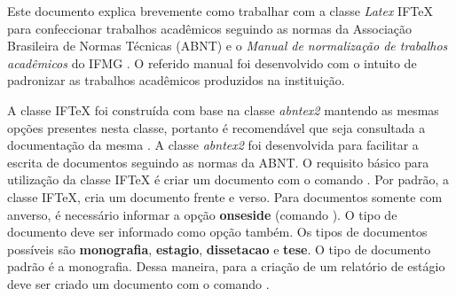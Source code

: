 Este documento explica brevemente como trabalhar com a classe \textit{Latex} {IF\TeX} para confeccionar trabalhos acadêmicos seguindo as normas da Associação Brasileira de Normas Técnicas (ABNT) e o \textit{Manual de normalização de trabalhos acadêmicos} do IFMG \cite{ifmg:2020:manual}.
O referido manual foi desenvolvido com o intuito de padronizar as trabalhos acadêmicos produzidos na instituição.

A classe {IF\TeX} foi construída com base na classe \textit{abntex2} mantendo as mesmas opções presentes nesta classe, portanto é recomendável que seja consultada a documentação da mesma \cite{araujo:2016:abntex2}.
A classe \textit{abntex2} foi desenvolvida para facilitar a escrita de documentos seguindo as normas da ABNT.
O requisito básico para utilização da classe {IF\TeX} é criar um documento com o comando .
Por padrão, a classe {IF\TeX}, cria um documento frente e verso.
Para documentos somente com anverso, é necessário informar a opção \textbf{onseside} (comando ).
O tipo de documento deve ser informado como opção também.
Os tipos de documentos possíveis são \textbf{monografia}, \textbf{estagio}, \textbf{dissetacao} e \textbf{tese}.
O tipo de documento padrão é a monografia.
Dessa maneira, para a criação de um relatório de estágio deve ser criado um documento com o comando .

